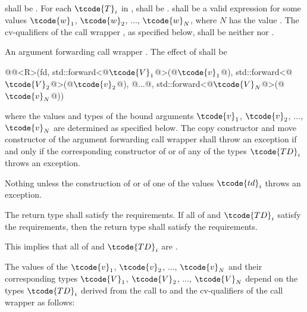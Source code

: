 \begin{itemdescr}
\pnum
\requires
{} shall be . For each $\tcode{T}_i$
in ,  shall be .
 shall be  a valid
expression for some
values $\tcode{w}_1$, $\tcode{w}_2$, $\dotsc$, $\tcode{w}_N$, where
$N$ has the value .
The cv-qualifiers \cv{} of the call wrapper ,
as specified below, shall be neither  nor .

\pnum
\returns
An argument forwarding call wrapper .
The effect of
 shall be
\begin{codeblock}
@@<R>(fd, std::forward<@$\tcode{V}_1$@>(@$\tcode{v}_1$@), std::forward<@$\tcode{V}_2$@>(@$\tcode{v}_2$@), @$\dotsc$@, std::forward<@$\tcode{V}_N$@>(@$\tcode{v}_N$@))
\end{codeblock}
where the values and types of the bound
arguments $\tcode{v}_1$, $\tcode{v}_2$, $\dotsc$, $\tcode{v}_N$ are determined as specified below.
The copy constructor and move constructor of the argument forwarding call wrapper shall throw an
exception if and only if the corresponding constructor of  or of any of the types
$\tcode{TD}_i$ throws an exception.

\pnum
\throws Nothing unless the construction of
 or of one of the values $\tcode{td}_i$ throws an exception.

\pnum
\remarks The return type shall satisfy the  requirements. If all
of  and $\tcode{TD}_i$ satisfy the  requirements, then the
return type shall satisfy the  requirements. \begin{note} This implies
that all of  and $\tcode{TD}_i$ are . \end{note}
\end{itemdescr}

\pnum
{}%
The values of the  $\tcode{v}_1$, $\tcode{v}_2$, $\dotsc$, $\tcode{v}_N$ and their
corresponding types $\tcode{V}_1$, $\tcode{V}_2$, $\dotsc$, $\tcode{V}_N$ depend on the
types $\tcode{TD}_i$ derived from
the call to  and the
cv-qualifiers \cv{} of the call wrapper  as follows:

